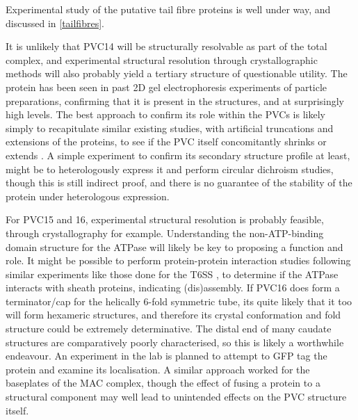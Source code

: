 Experimental study of the putative tail fibre proteins is well under way, and discussed in \vref{tailfibres}.

It is unlikely that PVC14 will be structurally resolvable as part of the total complex, and experimental structural resolution through crystallographic methods will also probably yield a tertiary structure of questionable utility. The protein has been seen in past 2D gel electrophoresis experiments of particle preparations, confirming that it is present in the structures, and at surprisingly high levels. The best approach to confirm its role within the PVCs is likely simply to recapitulate similar existing studies, with artificial truncations and extensions of the proteins, to see if the PVC itself concomitantly shrinks or extends \citep{Rybakova2015}. A simple experiment to confirm its secondary structure profile at least, might be to heterologously express it and perform circular dichroism studies, though this is still indirect proof, and there is no guarantee of the stability of the protein under heterologous expression.

For PVC15 and 16, experimental structural resolution is probably feasible, through crystallography for example. Understanding the non-ATP-binding domain structure for the ATPase will likely be key to proposing a function and role. It might be possible to perform protein-protein interaction studies following similar experiments like those done for the T6SS \citep{Douzi2016}, to determine if the ATPase interacts with sheath proteins, indicating (dis)assembly. If PVC16 does form a terminator/cap for the helically 6-fold symmetric tube, its quite likely that it too will form hexameric structures, and therefore its crystal conformation and fold structure could be extremely determinative. The distal end of many caudate structures are comparatively poorly characterised, so this is likely a worthwhile endeavour. An experiment in the lab is planned to attempt to GFP tag the protein and examine its localisation. A similar approach worked for the baseplates of the MAC complex, though the effect of fusing a protein to a structural component may well lead to unintended effects on the PVC structure itself.



